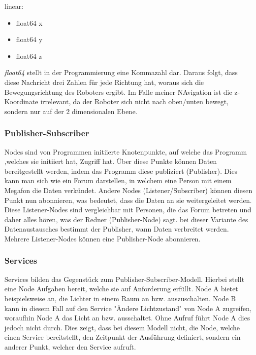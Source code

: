 {{		linear:
		\begin{itemize}
			\item float64 x
			\item float64 y
			\item float64 z
		\end{itemize}
		
		\textit{float64} stellt in der Programmierung eine Kommazahl dar. Daraus folgt, dass diese Nachricht drei Zahlen für jede Richtung hat, woraus sich die Bewegungsrichtung des Roboters ergibt. Im Falle meiner NAvigation ist die z-Koordinate irrelevant, da der Roboter sich nicht nach oben/unten bewegt, sondern nur auf der 2 dimensionalen Ebene.
	}
	
	\subsubsection{Publisher-Subscriber}
	{
		Nodes sind von Programmen initiierte Knotenpunkte, auf welche das Programm ,welches sie initiiert hat, Zugriff hat. Über diese Punkte können Daten bereitgestellt werden, indem das Programm diese publiziert (Publisher). Dies kann man sich wie ein Forum darstellen, in welchem eine Person mit einem Megafon die Daten verkündet. Andere Nodes (Listener/Subscriber) können diesen Punkt nun abonnieren, was bedeutet, dass die Daten an sie weitergeleitet werden. Diese Listener-Nodes sind vergleichbar mit Personen, die das Forum betreten und daher alles hören, was der Redner (Publisher-Node) sagt. bei dieser Variante des Datenaustausches bestimmt der Publisher, wann Daten verbreitet werden. Mehrere Listener-Nodes können eine Publisher-Node abonnieren.
	}
	\subsubsection{Services}
	{ 
		Services bilden das Gegenstück zum Publisher-Subscriber-Modell. Hierbei stellt eine Node Aufgaben bereit, welche sie auf Anforderung erfüllt. Node A bietet beispielsweise an, die Lichter in einem Raum an bzw. auszuschalten. Node B kann in diesem Fall auf den Service "Ändere Lichtzustand" von Node A zugreifen, woraufhin Node A das Licht an bzw. ausschaltet. Ohne Aufruf führt Node A dies jedoch nicht durch. Dies zeigt, dass bei diesem Modell nicht, die Node, welche einen Service bereitstellt, den Zeitpunkt der Ausführung definiert, sondern ein anderer Punkt, welcher den Service aufruft.
	}

}
